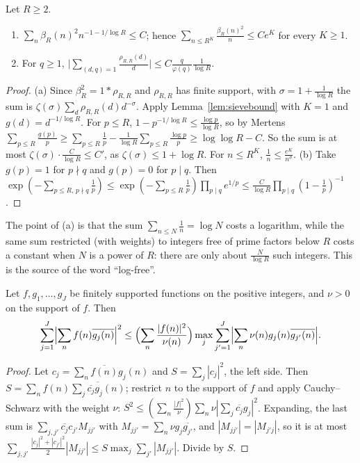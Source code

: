 \begin{corollary}\label{cor:sievesums}
Let $R\ge2$.
\begin{enumerate}[label=(\alph*)]
\item $\sum_n\beta_R(n)^2n^{-1-1/\log R}\le C$; hence $\sum_{n\le R^K}\frac{\beta_R(n)^2}n\le Ce^K$ for every $K\ge1$.
\item For $q\ge1$, $\bigl|\sum_{(d,q)=1}\frac{\rho_{R,R}(d)}d\bigr|\le C\frac q{\varphi(q)}\frac1{\log R}$.
\end{enumerate}
\end{corollary}
\begin{proof}
(a) Since $\beta_R^2=1*\rho_{R,R}$ and $\rho_{R,R}$ has finite support, with $\sigma=1+\frac1{\log R}$ the sum is $\zeta(\sigma)\sum_d\rho_{R,R}(d)d^{-\sigma}$. Apply Lemma~\ref{lem:sievebound} with $K=1$ and $g(d)=d^{-1/\log R}$. For $p\le R$, $1-p^{-1/\log R}\le\frac{\log p}{\log R}$, so by Mertens $\sum_{p\le R}\frac{g(p)}p\ge\sum_{p\le R}\frac1p-\frac1{\log R}\sum_{p\le R}\frac{\log p}p\ge\log\log R-C$. So the sum is at most $\zeta(\sigma)\cdot\frac C{\log R}\le C'$, as $\zeta(\sigma)\le1+\log R$. For $n\le R^K$, $\frac1n\le\frac{e^K}{n^\sigma}$.
(b) Take $g(p)=1$ for $p\nmid q$ and $g(p)=0$ for $p\mid q$. Then $\exp(-\sum_{p\le R,\,p\nmid q}\frac1p)\le\exp(-\sum_{p\le R}\frac1p)\prod_{p\mid q}e^{1/p}\le\frac C{\log R}\prod_{p\mid q}(1-\frac1p)^{-1}$.
\end{proof}

The point of (a) is that the sum $\sum_{n\le N}\frac1n=\log N$ costs a logarithm, while the same sum restricted (with weights) to integers free of prime factors below $R$ costs a constant when $N$ is a power of $R$: there are only about $\frac N{\log R}$ such integers. This is the source of the word ``log-free''.

\begin{lemma}[duality]\label{lem:duality}
Let $f,g_1,\dots,g_J$ be finitely supported functions on the positive integers, and $\nu>0$ on the support of $f$. Then
\[
\sum_{j=1}^J\Bigl|\sum_nf(n)\overline{g_j(n)}\Bigr|^2\le\Bigl(\sum_n\frac{|f(n)|^2}{\nu(n)}\Bigr)\max_j\sum_{j'=1}^J\Bigl|\sum_n\nu(n)g_j(n)\overline{g_{j'}(n)}\Bigr|.
\]
\end{lemma}
\begin{proof}
Let $c_j=\sum_n\overline{f(n)}g_j(n)$ and $S=\sum_j|c_j|^2$, the left side. Then $S=\sum_nf(n)\overline{\sum_j\overline{c_j}g_j(n)}$; restrict $n$ to the support of $f$ and apply Cauchy--Schwarz with the weight $\nu$: $S^2\le(\sum_n\frac{|f|^2}\nu)\sum_n\nu|\sum_j\overline{c_j}g_j|^2$. Expanding, the last sum is $\sum_{j,j'}\overline{c_j}c_{j'}M_{jj'}$ with $M_{jj'}=\sum_n\nu g_j\overline{g_{j'}}$, and $|M_{jj'}|=|M_{j'j}|$, so it is at most $\sum_{j,j'}\frac{|c_j|^2+|c_{j'}|^2}2|M_{jj'}|\le S\max_j\sum_{j'}|M_{jj'}|$. Divide by $S$.
\end{proof}

